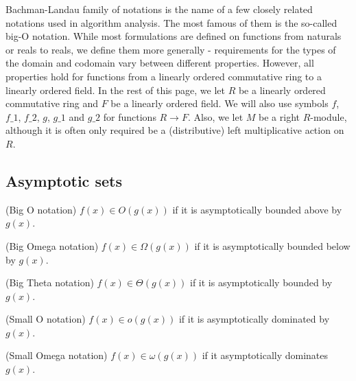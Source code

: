 Bachman-Landau family of notations is the name of a few closely related notations used in 
algorithm analysis. The most famous of them is the so-called big-O notation. While
most formulations are defined on functions from naturals or reals to reals, we define 
them more generally - requirements for the types of the domain and codomain vary between 
different properties. However, all properties hold for functions from a linearly ordered 
commutative ring to a linearly ordered field. In the rest of this page, we let $R$ be a linearly 
ordered commutative ring and $F$ be a linearly ordered field. We will also use symbols $f$, 
$f\_1$, $f\_2$, $g$, $g\_1$ and $g\_2$ for functions $R \to F$. Also, we let $M$ be 
a right $R$-module, although it is often only required be a (distributive) left multiplicative 
action on $R$.


\subsection{Asymptotic sets}

\begin{definition}(Big O notation)
    \label{def:big_o}
    \leanok
    $f(x) \in O(g(x))$ if it is asymptotically bounded above by $g(x)$.
\end{definition}

\begin{definition}(Big Omega notation)
    \label{def:big_omega}
    \leanok
    $f(x) \in \Omega(g(x))$ if it is asymptotically bounded below by $g(x)$.
\end{definition}

\begin{definition}(Big Theta notation)
    \label{def:big_theta}
    \leanok
    $f(x) \in \Theta(g(x))$ if it is asymptotically bounded by $g(x)$. 
\end{definition}

\begin{definition}(Small O notation)
    \label{def:small_o}
    \leanok
    $f(x) \in o(g(x))$ if it is asymptotically dominated by $g(x)$.
\end{definition}

\begin{definition}(Small Omega notation)
    \label{def:small_omega}
    \leanok
    $f(x) \in \omega(g(x))$ if it asymptotically dominates $g(x)$.
\end{definition}


